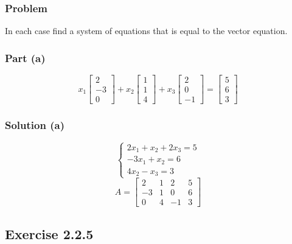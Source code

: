 \documentclass[12pt]{article}
\begin{document}
\subsubsection*{Problem}
In each case find a system of equations that is equal to the vector equation. 
\vspace{0.25in}
\subsubsection*{Part (a)}
\begin{equation*}
  x_1\begin{bmatrix}
  2\\ 
  -3\\ 
  0 
\end{bmatrix}
+ x_2\begin{bmatrix}
  1\\ 
  1\\ 
  4 
\end{bmatrix}
+ x_3\begin{bmatrix}
  2\\ 
  0\\ 
  -1 
\end{bmatrix}
 = \begin{bmatrix}
   5\\ 
   6\\ 
   3 
 \end{bmatrix}
\end{equation*}
\subsubsection*{Solution (a)}
\begin{equation*}
  \begin{cases}
    2x_1 + x_2 + 2x_3 = 5\\ 
    -3x_1 + x_2 = 6\\ 
    4x_2 - x_3 = 3 
  \end{cases}
\end{equation*}
\[
  A = \begin{bmatrix}
  2 & 1 & 2 & 5\\ 
  -3 & 1 & 0 & 6\\ 
  0 & 4 & -1 & 3 
\end{bmatrix}
\]
\vspace{2in}
\subsection*{Exercise 2.2.5}
\vspace{0.25in}
\end{document}
